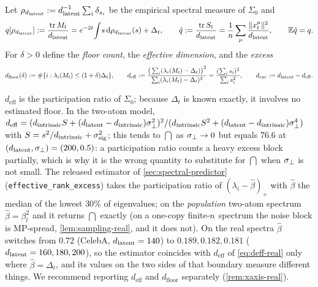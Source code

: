 \begin{definition}\label{def:deff-real}
Let $\rho_{d_{\mathrm{latent}}}:=d_{\mathrm{latent}}^{-1}\sum_i\delta_{s_i}$ be the empirical spectral measure of $\Sigma_0$ and
\begin{equation}\label{eq:q-real}
q[\rho_{d_{\mathrm{latent}}}]:=\frac{\operatorname{tr}M_t}{d_{\mathrm{latent}}}=e^{-2t}\!\int\! s\,\mathrm d\rho_{d_{\mathrm{latent}}}(s)+\Delta_t,\qquad \hat q:=\frac{\operatorname{tr}S_t}{d_{\mathrm{latent}}}=\frac1{n}\sum_\mu\frac{\|x_t^\mu\|^2}{d_{\mathrm{latent}}},\qquad \mathbb{E}\hat q=q .
\end{equation}
For $\delta>0$ define the \emph{floor count}, the \emph{effective dimension}, and the \emph{excess}
\begin{equation}\label{eq:deff-real}
d_{\mathrm{floor}}(\delta):=\#\{i:\lambda_i(M_t)\le(1+\delta)\Delta_t\},\qquad
d_{\mathrm{eff}}:=\frac{\big(\sum_i(\lambda_i(M_t)-\Delta_t)\big)^2}{\sum_i(\lambda_i(M_t)-\Delta_t)^2}=\frac{(\sum_is_i)^2}{\sum_is_i^2},\qquad
d_{\mathrm{exc}}:=d_{\mathrm{latent}}-d_{\mathrm{eff}} .
\end{equation}
\end{definition}
$d_{\mathrm{eff}}$ is the participation ratio of $\Sigma_0$; because $\Delta_t$ is known exactly, it involves no estimated floor. In the two-atom model, $d_{\mathrm{eff}}=(d_{\mathrm{intrinsic}} S+(d_{\mathrm{latent}}-d_{\mathrm{intrinsic}})\sigma_{\perp}^2)^2/(d_{\mathrm{intrinsic}} S^2+(d_{\mathrm{latent}}-d_{\mathrm{intrinsic}})\sigma_{\perp}^4)$ with $S=s^2/d_{\mathrm{intrinsic}}+\sigma_{\mathrm{sig}}^2$; this tends to $\dint$ as $\sigma_{\perp}\to0$ but equals $76.6$ at $(d_{\mathrm{latent}},\sigma_{\perp})=(200,0.5)$: a participation ratio counts a heavy excess block partially, which is why it is the wrong quantity to substitute for $\dint$ when $\sigma_{\perp}$ is not small. The released estimator of \cref{sec:spectral-predictor} (\texttt{effective\_rank\_excess}) takes the participation ratio of $(\lambda_i-\hat\beta)_+$ with $\hat\beta$ the median of the lowest $30\%$ of eigenvalues; on the \emph{population} two-atom spectrum $\hat\beta=\beta_t^2$ and it returns $\dint$ exactly (on a one-copy finite-$n$ spectrum the noise block is MP-spread, \cref{lem:sampling-real}, and it does not). On the real spectra $\hat\beta$ switches from $0.72$ (CelebA, $d_{\mathrm{latent}}=140$) to $0.189,0.182,0.181$ ($d_{\mathrm{latent}}=160,180,200$), so the estimator coincides with $d_{\mathrm{eff}}$ of \eqref{eq:deff-real} only where $\hat\beta=\Delta_t$, and its values on the two sides of that boundary measure different things. We recommend reporting $d_{\mathrm{eff}}$ and $d_{\mathrm{floor}}$ separately (\cref{rem:xaxis-real}).

